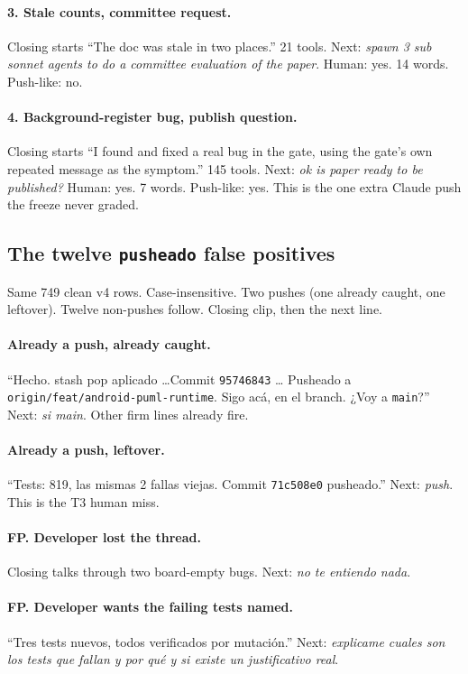 \paragraph{3. Stale counts, committee request.}
Closing starts ``The doc was stale in two places.'' 21 tools.
Next: \emph{spawn 3 sub sonnet agents to do a committee evaluation
of the paper}. Human: yes. 14 words. Push-like: no.

\paragraph{4. Background-register bug, publish question.}
Closing starts ``I found and fixed a real bug in the gate, using the
gate's own repeated message as the symptom.'' 145 tools. Next:
\emph{ok is paper ready to be published?} Human: yes. 7 words.
Push-like: yes. This is the one extra Claude push the freeze never
graded.


\subsection{The twelve \texttt{pusheado} false positives}
\label{app:pusheado}

Same 749 clean v4 rows. Case-insensitive. Two pushes (one already
caught, one leftover). Twelve non-pushes follow. Closing clip,
then the next line.

\paragraph{Already a push, already caught.}
``Hecho. stash pop aplicado \ldots Commit \texttt{95746843} \ldots
Pusheado a \texttt{origin/feat/android-puml-runtime}. Sigo ac\'a,
en el branch. ¿Voy a \texttt{main}?''
Next: \emph{si main}. Other firm lines already fire.

\paragraph{Already a push, leftover.}
``Tests: 819, las mismas 2 fallas viejas. Commit
\texttt{71c508e0} pusheado.''
Next: \emph{push}. This is the T3 human miss.

\paragraph{FP. Developer lost the thread.}
Closing talks through two board-empty bugs. Next: \emph{no te
entiendo nada}.

\paragraph{FP. Developer wants the failing tests named.}
``Tres tests nuevos, todos verificados por mutaci\'on.'' Next:
\emph{explicame cuales son los tests que fallan y por qu\'e y si
existe un justificativo real}.

